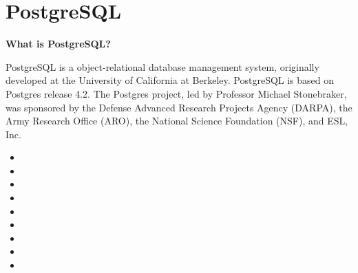 \section{PostgreSQL}
\textbf{What is PostgreSQL?}

PostgreSQL is a object-relational database management system,
originally developed at the University of California at Berkeley. 
PostgreSQL is based on  Postgres release 4.2. 
The Postgres project, led by Professor Michael Stonebraker, 
was sponsored by the Defense Advanced Research Projects Agency (DARPA), 
the Army Research Office (ARO), the National Science Foundation (NSF), 
and ESL, Inc.

\begin{itemize}
    \item {}
    \item {}
    \item {}
    \item {}
    \item {}
    \item {}
    \item {}
    \item {}
    \item {}
\end{itemize}